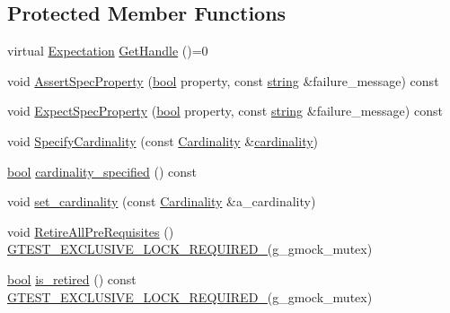 \subsection*{Protected Member Functions}
\begin{DoxyCompactItemize}
\item 
virtual \hyperlink{classtesting_1_1Expectation}{Expectation} \hyperlink{classtesting_1_1internal_1_1ExpectationBase_a678f6fc24742ab0236ebc9a8128e7bfe}{Get\+Handle} ()=0
\item 
void \hyperlink{classtesting_1_1internal_1_1ExpectationBase_a2644117ae8b59bd19aa526549a11d84e}{Assert\+Spec\+Property} (\hyperlink{classbool}{bool} property, const \hyperlink{namespacetesting_1_1internal_a8e8ff5b11e64078831112677156cb111}{string} \&failure\+\_\+message) const
\item 
void \hyperlink{classtesting_1_1internal_1_1ExpectationBase_a652adbe3fcca2950175e3859d59af268}{Expect\+Spec\+Property} (\hyperlink{classbool}{bool} property, const \hyperlink{namespacetesting_1_1internal_a8e8ff5b11e64078831112677156cb111}{string} \&failure\+\_\+message) const
\item 
void \hyperlink{classtesting_1_1internal_1_1ExpectationBase_a3d1d08542b32239d9b5738e3e32e2217}{Specify\+Cardinality} (const \hyperlink{classtesting_1_1Cardinality}{Cardinality} \&\hyperlink{classtesting_1_1internal_1_1ExpectationBase_a1399efffbc8675510a15c6ba1f18184b}{cardinality})
\item 
\hyperlink{classbool}{bool} \hyperlink{classtesting_1_1internal_1_1ExpectationBase_a8c3715b0c44d29eb53148036d9366940}{cardinality\+\_\+specified} () const
\item 
void \hyperlink{classtesting_1_1internal_1_1ExpectationBase_a6d416ffd4546ae84de79afb67ad05ada}{set\+\_\+cardinality} (const \hyperlink{classtesting_1_1Cardinality}{Cardinality} \&a\+\_\+cardinality)
\item 
void \hyperlink{classtesting_1_1internal_1_1ExpectationBase_afb623801e8de31fcd7b352e200649f7d}{Retire\+All\+Pre\+Requisites} () \hyperlink{gtest-port_8h_a149f693bd59fa1bc937af54c0cdcb32f}{G\+T\+E\+S\+T\+\_\+\+E\+X\+C\+L\+U\+S\+I\+V\+E\+\_\+\+L\+O\+C\+K\+\_\+\+R\+E\+Q\+U\+I\+R\+E\+D\+\_\+}(g\+\_\+gmock\+\_\+mutex)
\item 
\hyperlink{classbool}{bool} \hyperlink{classtesting_1_1internal_1_1ExpectationBase_afe539dbc5b29d9635403767a4708c476}{is\+\_\+retired} () const \hyperlink{gtest-port_8h_a149f693bd59fa1bc937af54c0cdcb32f}{G\+T\+E\+S\+T\+\_\+\+E\+X\+C\+L\+U\+S\+I\+V\+E\+\_\+\+L\+O\+C\+K\+\_\+\+R\+E\+Q\+U\+I\+R\+E\+D\+\_\+}(g\+\_\+gmock\+\_\+mutex)

\end{DoxyCompactItemize}
